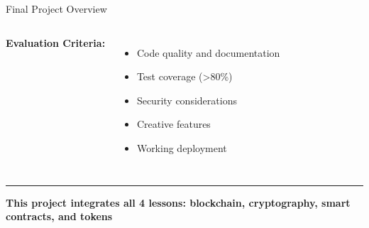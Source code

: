 \documentclass[8pt,aspectratio=169]{beamer}
\newcommand{\bottomnote}[1]{%
\vfill
\vspace{-2mm}
\textcolor{mllavender2}{\rule{\textwidth}{0.4pt}}
\vspace{1mm}
\footnotesize
\textbf{#1}
}
\begin{document}
\begin{frame}[t]{Final Project Overview}
\begin{columns}[T]
\vspace{0.3em}
\textbf{Evaluation Criteria:}
\begin{itemize}
\item Code quality and documentation
\item Test coverage (>80\%)
\item Security considerations
\item Creative features
\item Working deployment
\end{itemize}
\end{columns}

\bottomnote{This project integrates all 4 lessons: blockchain, cryptography, smart contracts, and tokens}
\end{frame}

\end{document}
